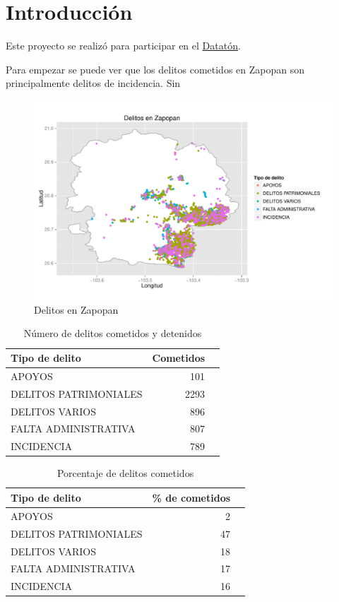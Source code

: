 \newpage
\section{Introducción}


\noindent  Este proyecto se realizó para participar en el \href{http://http://dataton.datos.gob.mx}{Datatón}.

Para empezar se puede ver que los delitos cometidos en Zapopan son principalmente delitos de incidencia. Sin 


\begin{figure}[H]
\centering
\caption{Delitos en Zapopan}
\includegraphics[width=120mm]{../../graphs/zapopan_delitos.pdf}
\end{figure}


\begin{table}[H]
\centering
\caption{Número de delitos cometidos y detenidos} 
\begin{tabular}{lrr}
  \hline
Tipo de delito & Cometidos  \\ 
  \hline
APOYOS & 101  \\ 
  DELITOS PATRIMONIALES & 2293 \\ 
  DELITOS VARIOS & 896 \\ 
  FALTA ADMINISTRATIVA & 807 \\ 
  INCIDENCIA & 789\\ 
   \hline
\end{tabular}
\end{table}

\begin{table}[H]
\centering
\caption{Porcentaje de delitos cometidos} 
\begin{tabular}{lrr}
  \hline
Tipo de delito & \% de cometidos  \\ 
  \hline
APOYOS & 2 \\ 
  DELITOS PATRIMONIALES & 47 \\ 
  DELITOS VARIOS & 18  \\ 
  FALTA ADMINISTRATIVA & 17  \\ 
  INCIDENCIA & 16  \\ 
   \hline
\end{tabular}
\end{table}

